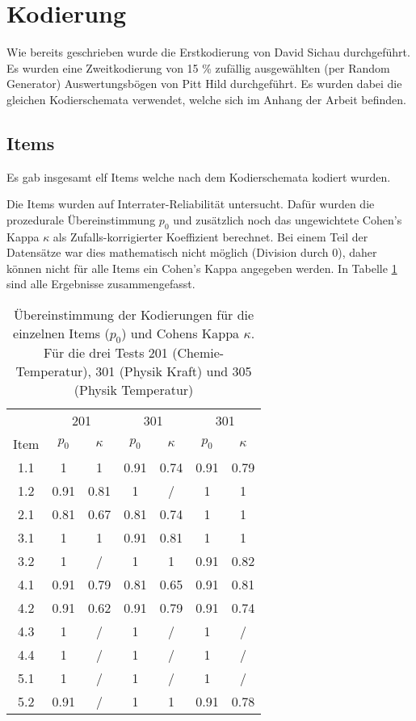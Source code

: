 \section{Kodierung}

Wie bereits geschrieben wurde die Erstkodierung von David Sichau durchgeführt. Es wurden eine Zweitkodierung von  15 \% zufällig ausgewählten (per Random Generator) Auswertungsbögen von Pitt Hild  durchgeführt. Es wurden dabei die gleichen Kodierschemata verwendet, welche sich im Anhang der Arbeit befinden. %

\subsection{Items}
Es gab insgesamt elf Items welche nach dem Kodierschemata kodiert wurden.

Die Items wurden auf Interrater-Reliabilität untersucht. Dafür wurden die prozedurale Übereinstimmung $p_0$ und zusätzlich noch das ungewichtete Cohen's Kappa $\kappa$ als Zufalls-korrigierter Koeffizient berechnet. Bei einem Teil der Datensätze war dies mathematisch nicht möglich (Division durch 0), daher können nicht für alle Items ein Cohen's Kappa angegeben werden. In Tabelle \ref{tab:CohenKappa} sind alle Ergebnisse zusammengefasst.



\begin{table}[htbp]
  \centering
\begin{tabular}{ccccccc}
\toprule   &  \multicolumn{2}{c}{201} &  \multicolumn{2}{c}{301}  & \multicolumn{2}{c}{301}\\
Item  & $p_0$ & $\kappa$ &  $p_0$ & $\kappa$ &  $p_0$ & $\kappa$\\
\midrule
 1.1 & 1 & 1  & 0.91 & 0.74 & 0.91 & 0.79 \\ 
 1.2 & 0.91 & 0.81  & 1 & /  & 1 & 1 \\ 
 2.1 & 0.81 & 0.67  & 0.81 & 0.74  & 1 & 1\\ 
 3.1 & 1 & 1  & 0.91 & 0.81  & 1 & 1\\ 
 3.2 & 1 & /  & 1 & 1  & 0.91 & 0.82\\ 
 4.1 & 0.91 & 0.79 & 0.81 & 0.65  & 0.91 & 0.81 \\ 
 4.2 & 0.91 & 0.62 & 0.91 & 0.79  & 0.91 & 0.74 \\ 
 4.3 & 1 & /  & 1 & /  & 1 & / \\ 
 4.4 & 1 & /  & 1 & /  & 1 & / \\ 
 5.1 & 1 & /  & 1 & /  & 1 & / \\ 
 5.2 & 0.91 & /  & 1 & 1  & 0.91 & 0.78 \\ 

\bottomrule

\end{tabular} 
  \caption{Übereinstimmung der Kodierungen für die einzelnen Items ($p_0$) und Cohens Kappa $\kappa$. Für die drei Tests 201 (Chemie-Temperatur), 301 (Physik Kraft) und 305 (Physik Temperatur)}
  \label{tab:CohenKappa}
\end{table}

